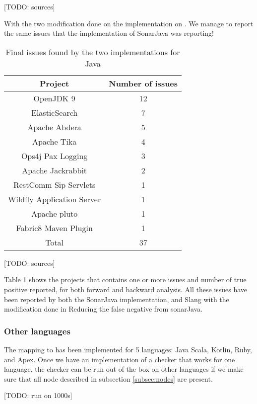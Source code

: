 [TODO: sources] \newline

With the two modification done on the implementation on \slang. We manage to report the same issues that the implementation of SonarJava was reporting!

\begin{table}[h]
	\centering
	\caption{Final issues found by the two implementations for Java}
	\label{table:issues-per-project}
	\begin{tabular}{|c|c|}
		\hline
		\bf Project & \bf Number of issues\\ \hline
		OpenJDK 9 & 12 \\
		ElasticSearch & 7 \\
		Apache Abdera & 5 \\
		Apache Tika & 	4 \\
		Ops4j Pax Logging & 3 \\
		Apache Jackrabbit & 2 \\
		RestComm Sip Servlets & 1 \\
		Wildfly Application Server & 1 \\
		Apache pluto & 1 \\
		Fabric8 Maven Plugin & 1 \\\hline
		Total &  37 \\ \hline
	\end{tabular}
\end{table}

[TODO: sources] \newline

Table \ref{table:issues-per-project} shows the projects that contains one or more issues and number of true positive reported, for both forward and backward analysis. All these issues have been reported by both the SonarJava implementation, and Slang with the modification done in Reducing the false negative from sonarJava.


\subsubsection{Other languages}
\label{subsubsec:other_languages}

The mapping to \slang has been implemented for 5 languages: Java Scala, Kotlin, Ruby, and Apex. Once we have an implementation of a checker that works for one language, the checker can be run out of the box on other languages if we make sure that all node described in subsection \ref{subsec:nodes} are present.

[TODO: run on 1000s] \newline

